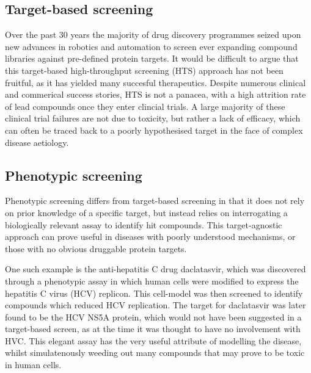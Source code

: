 \documentclass[a4paper,11pt,twoside,openright]{scrbook}
\begin{document}
\subsection{Target-based screening}
Over the past 30 years the majority of drug discovery programmes seized upon new advances in robotics and automation to screen ever expanding compound libraries against pre-defined protein targets.
It would be difficult to argue that this target-based high-throughput screening (HTS) approach has not been fruitful, as it has yielded many succesful therapeutics.
Despite numerous clinical and commerical success stories, HTS is not a panacea, with a high attrition rate of lead compounds once they enter clincial trials.
A large majority of these clinical trial failures are not due to toxicity, but rather a lack of efficacy, which can often be traced back to a poorly hypothesised target in the face of complex disease aetiology.


\subsection{Phenotypic screening}
Phenotypic screening differs from target-based screening in that it does not rely on prior knowledge of a specific target, but instead relies on interrogating a biologically relevant assay to identify hit compounds.
This target-agnostic approach can prove useful in diseases with poorly understood mechanisms, or those with no obvious druggable protein targets.

One such example is the anti-hepatitis C drug daclatasvir, which was discovered through a phenotypic assay in which human cells were modified to express the hepatitis C virus (HCV) replicon.
This cell-model was then screened to identify compounds which reduced HCV replication.
The target for daclatasvir was later found to be the HCV NS5A protein, which would not have been suggested in a target-based screen, as at the time it was thought to have no involvement with HVC.
This elegant assay has the very useful attribute of modelling the disease, whilst simulatenously weeding out many compounds that may prove to be toxic in human cells. %


\end{document}
